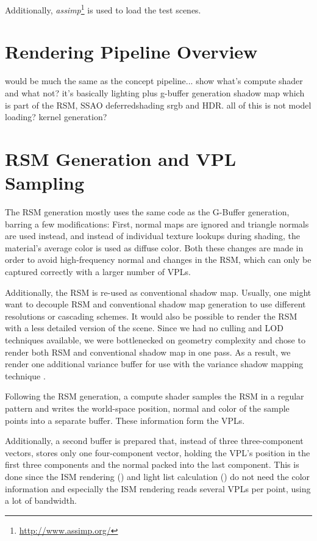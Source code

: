 Additionally, \textit{assimp}\footnote{\url{http://www.assimp.org/}} is used to load the test scenes.


\section{Rendering Pipeline Overview}
\begin{outline}
\1 would be much the same as the concept pipeline...
\1 show what's compute shader and what not?
\1 it's basically lighting plus
    \2 g-buffer generation
    \2 shadow map which is part of the RSM,
    \2 SSAO
    \2 deferredshading
    \2 srgb and HDR.
    \2 all of this is not
\1 model loading?
\1 kernel generation?
\end{outline}



\section{RSM Generation and VPL Sampling}
\label{sec:impl:rsmAndVplSampling}

The RSM generation mostly uses the same code as the G-Buffer generation, barring a few modifications: First, normal maps are ignored and triangle normals are used instead, and instead of individual texture lookups during shading, the material's average color is used as diffuse color. Both these changes are made in order to avoid high-frequency normal and changes in the RSM, which can only be captured correctly with a larger number of VPLs.

Additionally, the RSM is re-used as conventional shadow map. Usually, one might want to decouple RSM and conventional shadow map generation to use different resolutions or cascading schemes. It would also be possible to render the RSM with a less detailed version of the scene. Since we had no culling and LOD techniques available, we were bottlenecked on geometry complexity and chose to render both RSM and conventional shadow map in one pass. As a result, we render one additional variance buffer for use with the variance shadow mapping technique \citep{Donnelly:2006:VSM}.

Following the RSM generation, a compute shader samples the RSM in a regular pattern and writes the world-space position, normal and color of the sample points into a separate buffer. These information form the VPLs.

Additionally, a second buffer is prepared that, instead of three three-component vectors, stores only one four-component vector, holding the VPL's position in the first three components and the normal packed into the last component. This is done since the ISM rendering () and light list calculation () do not need the color information and especially the ISM rendering reads several VPLs per point, using a lot of bandwidth.


